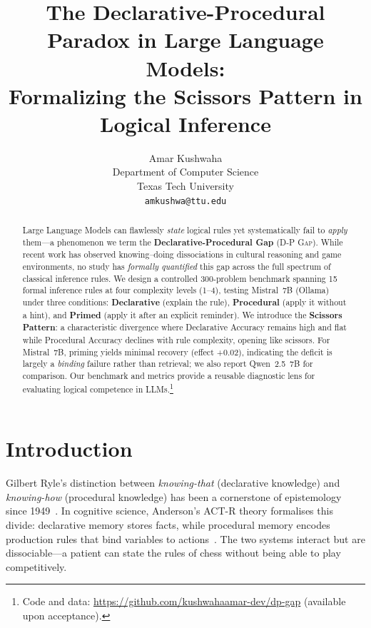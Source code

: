 \documentclass[11pt]{article}
\title{The Declarative-Procedural Paradox in Large Language Models:\\
Formalizing the Scissors Pattern in Logical Inference}
\author{Amar Kushwaha \\
  Department of Computer Science \\
  Texas Tech University \\
  \texttt{amkushwa@ttu.edu}}
\newcommand{\dpgap}{\textsc{D-P Gap}}
\begin{document}
\maketitle

\begin{abstract}
Large Language Models can flawlessly \emph{state} logical rules yet
systematically fail to \emph{apply} them---a phenomenon we term the
\textbf{Declarative-Procedural Gap} (\dpgap{}).
While recent work has observed knowing--doing dissociations in cultural
reasoning and game environments, no study has \emph{formally quantified}
this gap across the full spectrum of classical inference rules.
We design a controlled 300-problem benchmark spanning 15 formal
inference rules at four complexity levels (1--4), testing Mistral~7B (Ollama)
under three conditions: \textbf{Declarative} (explain the rule),
\textbf{Procedural} (apply it without a hint), and \textbf{Primed}
(apply it after an explicit reminder).
We introduce the \textbf{Scissors Pattern}: a characteristic divergence
where Declarative Accuracy remains high and flat while Procedural
Accuracy declines with rule complexity, opening like scissors.
For Mistral~7B, priming yields minimal recovery (effect +0.02), indicating
the deficit is largely a \emph{binding} failure rather than retrieval;
we also report Qwen~2.5~7B for comparison.
Our benchmark and metrics provide a reusable diagnostic lens for
evaluating logical competence in LLMs.\footnote{Code and data:
\url{https://github.com/kushwahaamar-dev/dp-gap} (available upon acceptance).}
\end{abstract}

\section{Introduction}
\label{sec:intro}

Gilbert Ryle's distinction between \emph{knowing-that} (declarative
knowledge) and \emph{knowing-how} (procedural knowledge) has been a
cornerstone of epistemology since 1949~\cite{ryle1949}.
In cognitive science, Anderson's ACT-R theory formalises this divide:
declarative memory stores facts, while procedural memory encodes
production rules that bind variables to actions~\cite{anderson1983}.
The two systems interact but are dissociable---a patient can state the
rules of chess without being able to play competitively.
\end{document}
